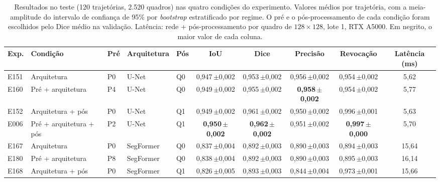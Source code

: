 \begin{table}[htbp]
\centering
\caption{Resultados no teste (120 trajetórias, 2.520 quadros) nas quatro condições do experimento. Valores médios por trajetória, com a meia-amplitude do intervalo de confiança de 95\% por \textit{bootstrap} estratificado por regime. O pré e o pós-processamento de cada condição foram escolhidos pelo Dice médio na validação. Latência: rede + pós-processamento por quadro de $128\times128$, lote 1, RTX A5000. Em negrito, o maior valor de cada coluna.}
\label{tab:principal}
\footnotesize\setlength{\tabcolsep}{3pt}
\begin{sbcfitwidth}
\begin{tabular}{lllllccccc}
\toprule
Exp. & Condição & Pré & Arquitetura & Pós & IoU & Dice & Precisão & Revocação & Latência (ms) \\
\midrule
E151 & Arquitetura & P0 & U-Net & Q0 & 0{,}947\,{\scriptsize$\pm$0{,}002} & 0{,}953\,{\scriptsize$\pm$0{,}002} & 0{,}956\,{\scriptsize$\pm$0{,}002} & 0{,}954\,{\scriptsize$\pm$0{,}002} & 5{,}62 \\
E160 & Pré + arquitetura & P4 & U-Net & Q0 & 0{,}949\,{\scriptsize$\pm$0{,}002} & 0{,}955\,{\scriptsize$\pm$0{,}002} & \textbf{0{,}958\,{\scriptsize$\pm$0{,}002}} & 0{,}954\,{\scriptsize$\pm$0{,}002} & 5{,}77 \\
E152 & Arquitetura + pós & P0 & U-Net & Q1 & 0{,}949\,{\scriptsize$\pm$0{,}002} & 0{,}961\,{\scriptsize$\pm$0{,}002} & 0{,}950\,{\scriptsize$\pm$0{,}002} & 0{,}996\,{\scriptsize$\pm$0{,}001} & 5{,}63 \\
E006 & Pré + arquitetura + pós & P2 & U-Net & Q1 & \textbf{0{,}950\,{\scriptsize$\pm$0{,}002}} & \textbf{0{,}962\,{\scriptsize$\pm$0{,}002}} & 0{,}951\,{\scriptsize$\pm$0{,}002} & \textbf{0{,}997\,{\scriptsize$\pm$0{,}000}} & 5{,}70 \\
\midrule
E167 & Arquitetura & P0 & SegFormer & Q0 & 0{,}837\,{\scriptsize$\pm$0{,}004} & 0{,}892\,{\scriptsize$\pm$0{,}003} & 0{,}890\,{\scriptsize$\pm$0{,}003} & 0{,}894\,{\scriptsize$\pm$0{,}003} & 15{,}64 \\
E180 & Pré + arquitetura & P8 & SegFormer & Q0 & 0{,}838\,{\scriptsize$\pm$0{,}004} & 0{,}892\,{\scriptsize$\pm$0{,}003} & 0{,}890\,{\scriptsize$\pm$0{,}003} & 0{,}895\,{\scriptsize$\pm$0{,}003} & 16{,}14 \\
E168 & Arquitetura + pós & P0 & SegFormer & Q1 & 0{,}826\,{\scriptsize$\pm$0{,}005} & 0{,}893\,{\scriptsize$\pm$0{,}003} & 0{,}844\,{\scriptsize$\pm$0{,}004} & 0{,}973\,{\scriptsize$\pm$0{,}001} & 15{,}66 \\

\end{tabular}
\end{sbcfitwidth}
\end{table}
